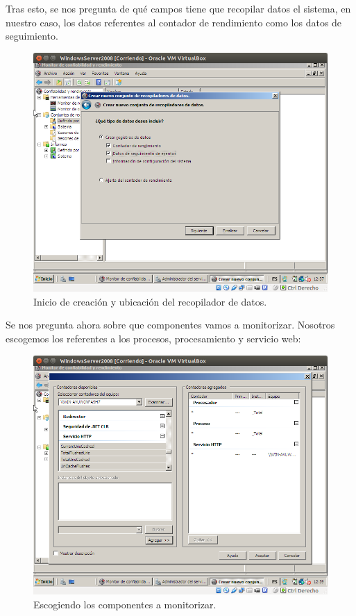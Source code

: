 \begin{itemize}
		
		Tras esto, se nos pregunta de qué campos tiene que recopilar datos el sistema, en nuestro caso, los datos referentes al contador de rendimiento como los datos de seguimiento.\\
		\begin{figure}[H]
			\centering
			\includegraphics[width=0.6\linewidth]{InicioRecopiladorDatos}
			\caption[RecopiladorDatos]{Inicio de creación y ubicación del recopilador de datos.}
			\label{fig:InicioRecopiladorDatos}
		\end{figure}
		
		Se nos pregunta ahora sobre que componentes vamos a monitorizar. Nosotros escogemos los referentes a los procesos, procesamiento y servicio web:\\
		\begin{figure}[H]
		\centering
		\includegraphics[width=0.6\linewidth]{MonitorizarWindowsServicios}
		\caption[ServiciosWindows]{Escogiendo los componentes a monitorizar.}
		\label{fig:MonitorizarWindowsServicios}
		\end{figure}
		

\end{itemize}
